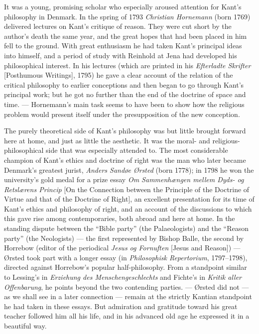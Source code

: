 \documentclass[12pt,a4paper]{book}
\newcommand{\opage}[1]{\marginnote{\footnotesize\textit{[#1]}}}
\begin{document}
It was a young, promising scholar who especially aroused attention for Kant's
philosophy in Denmark. In the spring of 1793 \emph{Christian Hornemann} (born 1769)
delivered lectures on Kant's critique of reason. They were cut short by the
author's death the same year, and the great hopes that had been placed in him fell
to the ground. With great enthusiasm he had taken Kant's principal ideas into
himself, and a period of study with Reinhold at Jena had developed his
philosophical interest. In his lectures (which are printed in his \emph{Efterladte
Skrifter} [Posthumous Writings], 1795) he gave a clear account of the relation of
the critical philosophy to earlier conceptions and then began to go through Kant's
principal work; but he got no further than the end of the doctrine of space and
time. --- Hornemann's main task seems to have been to show how the religious
problem would present itself under the presupposition of the new conception.

The purely theoretical side of Kant's philosophy was but little \opage{27}brought forward
here at home, and just as little the aesthetic. It was the moral- and
religious-philosophical side that was especially attended to. The most
considerable champion of Kant's ethics and doctrine of right was the man who later
became Denmark's greatest jurist, \emph{Anders Sandøe Ørsted} (born 1778); in 1798 he won
the university's gold medal for a prize essay \emph{Om Sammenhængen mellem Dyds- og
Retslærens Princip} [On the Connection between the Principle of the Doctrine of
Virtue and that of the Doctrine of Right], an excellent presentation for its time
of Kant's ethics and philosophy of right, and an account of the discussions to
which this gave rise among contemporaries, both abroad and here at home. In the
standing dispute between the ``Bible party'' (the Palaeologists) and the ``Reason
party'' (the Neologists) --- the first represented by Bishop Balle, the second by
Horrebow (editor of the periodical \emph{Jesus og Fornuften} [Jesus and Reason])
--- Ørsted took part with a longer essay (in \emph{Philosophisk Repertorium},
1797--1798), directed against Horrebow's popular half-philosophy. From a standpoint
similar to Lessing's in \emph{Erziehung des Menschengeschlechts} and Fichte's in
\emph{Kritik aller Offenbarung}, he points beyond the two contending parties. ---
Ørsted did not --- as we shall see in a later connection --- remain at the strictly
Kantian standpoint he had taken in these essays. But admiration and gratitude
toward his great teacher followed him all his life, and in his advanced old age he
expressed it in a beautiful way.
\end{document}
